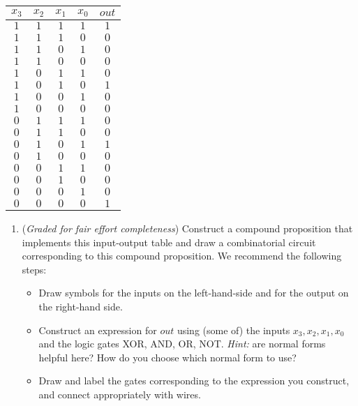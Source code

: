 \begin{enumerate}
   \begin{center}
   \begin{tabular}{cccc|c}
   $x_3$ & $x_2$ & $x_1$ & $x_0$ & $out$\\
   \hline
   $1$ & $1$ & $1$ & $1$ & $1$\\
   $1$ & $1$ & $1$ & $0$ & $0$\\
   $1$ & $1$ & $0$ & $1$ & $0$\\
   $1$ & $1$ & $0$ & $0$ & $0$\\
   $1$ & $0$ & $1$ & $1$ & $0$\\
   $1$ & $0$ & $1$ & $0$ & $1$\\
   $1$ & $0$ & $0$ & $1$ & $0$\\
   $1$ & $0$ & $0$ & $0$ & $0$\\
   $0$ & $1$ & $1$ & $1$ & $0$\\
   $0$ & $1$ & $1$ & $0$ & $0$\\
   $0$ & $1$ & $0$ & $1$ & $1$\\
   $0$ & $1$ & $0$ & $0$ & $0$\\
   $0$ & $0$ & $1$ & $1$ & $0$\\
   $0$ & $0$ & $1$ & $0$ & $0$\\
   $0$ & $0$ & $0$ & $1$ & $0$\\
   $0$ & $0$ & $0$ & $0$ & $1$\\
   \end{tabular}
   \end{center}
   \begin{enumerate}   
   \item  ({\it Graded for fair effort completeness}) 
   Construct a compound proposition that implements this input-output table
   and draw a combinatorial circuit corresponding to this compound proposition. We recommend
   the following steps:
   
   \begin{itemize}
   \item Draw symbols for the inputs on the left-hand-side and for the output on the right-hand side.
   \item Construct an expression for $out$ using (some of) the inputs 
   $x_3, x_2, x_1, x_0$ and the logic gates XOR, AND, OR, NOT. {\it Hint:} are normal forms helpful here?
   How do you choose which normal form to use?
   \item Draw and label the gates corresponding to the expression you construct, and connect appropriately with wires.
   \end{itemize}
   

\end{enumerate}
\end{enumerate}
